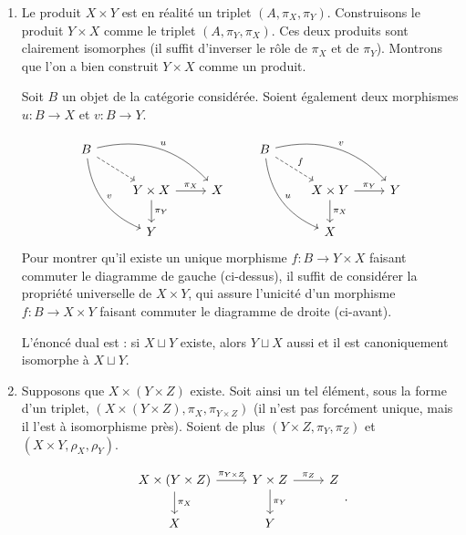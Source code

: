 \documentclass{../../td}
\begin{document}
  \begin{enumerate}
    \item Le produit $X \times Y$ est en réalité un triplet $(A, \pi_X, \pi_Y)$.
      Construisons le produit $Y \times X$ comme le triplet $(A, \pi_Y, \pi_X)$.
      Ces deux produits sont clairement isomorphes (il suffit d'inverser le rôle de $\pi_X$ et de $\pi_Y$).
      Montrons que l'on a bien construit $Y \times X$ comme un produit.

      Soit $B$ un objet de la catégorie considérée.
      Soient également deux morphismes $u : B \to X$ et $v : B \to Y$.

      \[
    \begin{tikzcd}
      B \arrow[dashed]{dr}{} \arrow[bend left]{drr}{u}\arrow[bend right]{rdd}{v}\\
      & {Y\times X} \arrow{r}{\pi_X}\arrow{d}{\pi_Y} & X \\
      & Y
    \end{tikzcd}
    \quad\quad
    \begin{tikzcd}
      B \arrow[dashed]{dr}{f} \arrow[bend left]{drr}{v}\arrow[bend right]{rdd}{u}\\
      & {X \times Y} \arrow{r}{\pi_Y}\arrow{d}{\pi_X} & Y \\
      & X
    \end{tikzcd}
      \]
      Pour montrer qu'il existe un unique morphisme $f : B \to Y \times X$ faisant commuter le diagramme de gauche (ci-dessus), il suffit de considérer la propriété universelle de $X \times Y$, qui assure l'unicité d'un morphisme $f : B \to X \times Y$ faisant commuter le diagramme de droite (ci-avant).

      L'énoncé dual est : si $X \sqcup Y$ existe, alors $Y \sqcup X$ aussi et il est canoniquement isomorphe à $X \sqcup Y$.

    \item Supposons que $X \times (Y \times Z)$ existe.
      Soit ainsi un tel élément, sous la forme d'un triplet, $(X \times (Y \times Z), \pi_X, \pi_{Y \times Z})$ (il n'est pas forcément unique, mais il l'est à isomorphisme près).
      Soient de plus $(Y \times Z, \pi_Y, \pi_Z)$ et $(X \times Y, \rho_X, \rho_Y)$.

      \[
      \begin{tikzcd}
        X \times (Y \times Z) \arrow{r}{\pi_{Y \times Z}}\arrow{d}{\pi_X} & Y \times Z\arrow{d}{\pi_Y}\arrow{r}{\pi_Z} & Z\\
        X & Y
      \end{tikzcd}
      .\]


\end{enumerate}
\end{document}
